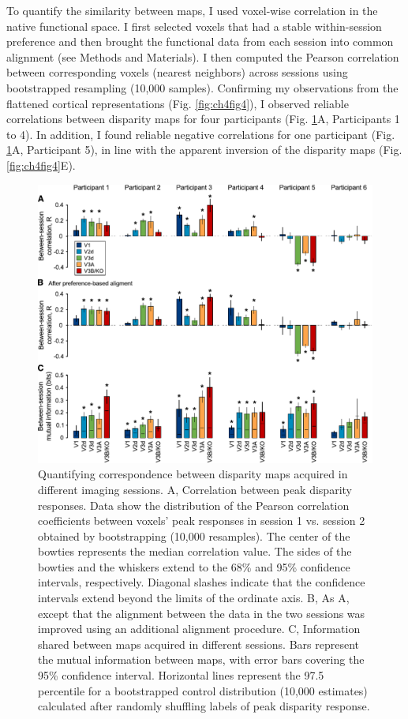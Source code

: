 To quantify the similarity between maps, I used voxel-wise correlation in the native functional space. I first selected voxels that had a stable within-session preference and then brought the functional data from each session into common alignment (see Methods and Materials). I then computed the Pearson correlation between corresponding voxels (nearest neighbors) across sessions using bootstrapped resampling (10,000 samples). Confirming my observations from the flattened cortical representations (Fig. \ref{fig:ch4fig4}), I observed reliable correlations between disparity maps for four participants (Fig. \ref{fig:ch4fig5}A, Participants 1 to 4). In addition, I found reliable negative correlations for one participant (Fig. \ref{fig:ch4fig5}A, Participant 5), in line with the apparent inversion of the disparity maps (Fig. \ref{fig:ch4fig4}E). 

\begin{figure}
  \centering
  \includegraphics[width=14cm, keepaspectratio]{fig5}
  \caption[Quantifying correspondence between disparity maps.]{Quantifying correspondence between disparity maps acquired in different imaging sessions. A, Correlation between peak disparity responses. Data show the distribution of the Pearson correlation coefficients between voxels' peak responses in session 1 vs. session 2 obtained by bootstrapping (10,000 resamples). The center of the bowties represents the median correlation value. The sides of the bowties and the whiskers extend to the 68\% and 95\% confidence intervals, respectively. Diagonal slashes indicate that the confidence intervals extend beyond the limits of the ordinate axis. B, As A, except that the alignment between the data in the two sessions was improved using an additional alignment procedure. C, Information shared between maps acquired in different sessions. Bars represent the mutual information between maps, with error bars covering the 95\% confidence interval. Horizontal lines represent the 97.5 percentile for a bootstrapped control distribution (10,000 estimates) calculated after randomly shuffling labels of peak disparity response.}
  \label{fig:ch4fig5}
\end{figure}

